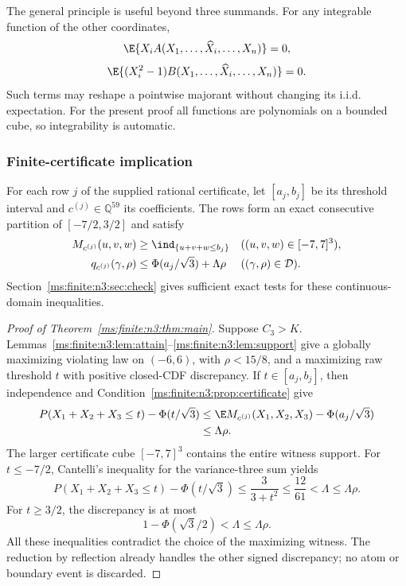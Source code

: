 The general principle is useful beyond three summands. For any integrable
function of the other coordinates,
\[
 \E\{X_i A(X_1,\ldots,\widehat X_i,\ldots,X_n)\}=0,
\]
\[
 \E\{(X_i^2-1)B(X_1,\ldots,\widehat X_i,\ldots,X_n)\}=0.
\]
Such terms may reshape a pointwise majorant without changing its i.i.d.
expectation. For the present proof all functions are polynomials on a
bounded cube, so integrability is automatic.

\subsubsection{Finite-certificate implication}
\begin{condition}\label{ms:finite:n3:prop:certificate}
For each row $j$ of the supplied rational certificate, let $[a_j,b_j]$
be its threshold interval and $c^{(j)}\in\mathbb Q^{59}$ its coefficients.
The rows form an exact consecutive partition of $[-7/2,3/2]$ and satisfy
\begin{align}
 M_{c^{(j)}}(u,v,w)&\ge\ind_{\{u+v+w\le b_j\}}
       &&((u,v,w)\in[-7,7]^3),\label{ms:finite:n3:eq:pointwise}\\
 q_{c^{(j)}}(\gamma,\rho)&\le
      \Phi(a_j/\sqrt3)+\Lambda\rho
       &&((\gamma,\rho)\in\mathcal D).\label{ms:finite:n3:eq:scalar}
\end{align}
Section~\ref{ms:finite:n3:sec:check} gives sufficient exact tests for these
continuous-domain inequalities.
\end{condition}

\begin{proof}[Proof of Theorem~\ref{ms:finite:n3:thm:main}]
Suppose $C_3>K$. Lemmas~\ref{ms:finite:n3:lem:attain}--\ref{ms:finite:n3:lem:support} give a globally
maximizing violating law on $(-6,6)$, with $\rho<15/8$, and a maximizing
raw threshold $t$ with positive closed-CDF discrepancy.
If $t\in[a_j,b_j]$, then independence and Condition~\ref{ms:finite:n3:prop:certificate}
give
\begin{align*}
 P(X_1+X_2+X_3\le t)-\Phi(t/\sqrt3)
 &\le\E M_{c^{(j)}}(X_1,X_2,X_3)-\Phi(a_j/\sqrt3)\\
 &\le\Lambda\rho.
\end{align*}
The larger certificate cube $[-7,7]^3$ contains the entire witness support.
For $t\le-7/2$, Cantelli's inequality for the variance-three sum yields
\[
 P(X_1+X_2+X_3\le t)-\Phi(t/\sqrt3)
 \le\frac3{3+t^2}\le\frac{12}{61}<\Lambda\le\Lambda\rho.
\]
For $t\ge3/2$, the discrepancy is at most
\[
 1-\Phi(\sqrt3/2)<\Lambda\le\Lambda\rho.
\]
All these inequalities contradict the choice of the maximizing witness.
The reduction by reflection already handles the other signed discrepancy;
no atom or boundary event is discarded.
\end{proof}

